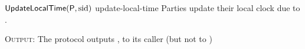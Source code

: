 \begin{cccProtocol}
    {$\mathsf{UpdateLocalTime}(\mathsf{P}, \mathrm{sid})$}
    {update-local-time}
    {Parties update their local clock due to \funcDriftingClock.}
    
    \begin{algorithmic}[1]

        \State{$\fetchCompleted \gets \false$}
        \EndIf
        \State{$\epoch \gets \lceil \interval / (\epochLen / \syncLen) \rceil$}
    \end{algorithmic}

    \textsc{Output:} The protocol outputs \localTime, \epoch to its caller (but not to \Z)
\end{cccProtocol}